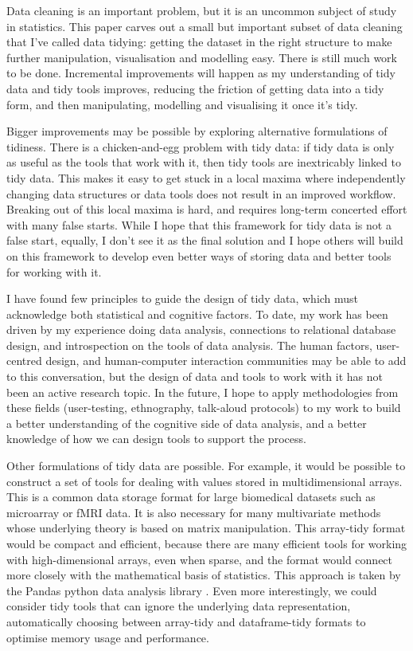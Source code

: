 \documentclass[article]{jss}
\begin{document}
Data cleaning is an important problem, but it is an uncommon subject of study in statistics. This paper carves out a small but important subset of data cleaning that I've called data tidying: getting the dataset in the right structure to make further manipulation, visualisation and modelling easy. There is still much work to be done. Incremental improvements will happen as my understanding of tidy data and tidy tools improves, reducing the friction of getting data into a tidy form, and then manipulating, modelling and visualising it once it's tidy.

Bigger improvements may be possible by exploring alternative formulations of tidiness. There is a chicken-and-egg problem with tidy data: if tidy data is only as useful as the tools that work with it, then tidy tools are inextricably linked to tidy data. This makes it easy to get stuck in a local maxima where independently changing data structures or data tools does not result in an improved workflow. Breaking out of this local maxima is hard, and requires long-term concerted effort with many false starts. While I hope that this framework for tidy data is not a false start, equally, I don't see it as the final solution and I hope others will build on this framework to develop even better ways of storing data and better tools for working with it.

I have found few principles to guide the design of tidy data, which must acknowledge both statistical and cognitive factors. To date, my work has been driven by my experience doing data analysis, connections to relational database design, and introspection on the tools of data analysis. The human factors, user-centred design, and human-computer interaction communities may be able to add to this conversation, but the design of data and tools to work with it has not been an active research topic. In the future, I hope to apply methodologies from these fields (user-testing, ethnography, talk-aloud protocols) to my work to build a better understanding of the cognitive side of data analysis, and a better knowledge of how we can design tools to support the process.

Other formulations of tidy data are possible. For example, it would be possible to construct a set of tools for dealing with values stored in multidimensional arrays. This is a common data storage format for large biomedical datasets such as microarray or fMRI data. It is also necessary for many multivariate methods whose underlying theory is based on matrix manipulation. This array-tidy format would be compact and efficient, because there are many efficient tools for working with high-dimensional arrays, even when sparse, and the format would connect more closely with the mathematical basis of statistics. This approach is taken by the Pandas python data analysis library \citep{mckinney:2010}. Even more interestingly, we could consider tidy tools that can ignore the underlying data representation, automatically choosing between array-tidy and dataframe-tidy formats to optimise memory usage and performance.
\end{document}

